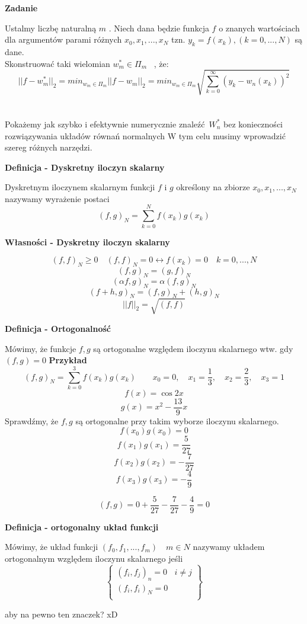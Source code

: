 \documentclass[polish]{kbk}
\begin{document}
\begin{center}
\textbf{Zadanie}
\end{center}
Ustalmy liczbę naturalną  \(m\) . Niech dana będzie funkcja \(f\) o znanych wartościach dla argumentów parami różnych \(x_0, x_1, ... , x_N\) tzn. 
 \(y_k = f(x_k), (k =0,...,N) \) są dane.\\
Skonstruować taki wielomian \(   w^{*}_m \in \Pi_{m}  \) ~\cite{znaczek}, że:
$$ || f -  w^{*}_m ||_2 = min_{ w_m \in \Pi_m } || f - w_m||_2 = min_{ w_m \in \Pi_m } \sqrt{  \sum_{k=0}^{\infty} (y_k - w_n (x_k))^2 }$$
\\
\\
Pokażemy jak szybko i efektywnie numerycznie znaleźć \(W^{*}_n \) bez konieczności rozwiązywania układów równań normalnych
W tym celu musimy wprowadzić szereg różnych narzędzi.
\\
\begin{center}
\textbf{Definicja - Dyskretny iloczyn skalarny}
\end{center}

Dyskretnym iloczynem skalarnym funkcji \(f\) i \(g\) określony na zbiorze  \(x_0, x_1, ... , x_N\) nazywamy wyrażenie postaci
$$ (f,g)_N =  \sum_{k=0}^{N} f(x_k)  g(x_k) $$


\begin{center}
\textbf{Własności - Dyskretny iloczyn skalarny}
\end{center}
$$ (f,f)_N \geq 0 \quad (f,f)_N = 0  \leftrightarrow  f(x_k) = 0  \quad k = 0,...,N$$
$$ (f,g)_N = (g,f)_N $$
$$ (\alpha f,g)_N = \alpha (f,g)_N $$
$$ (f+h, g)_N = (f,g)_N + (h,g)_N $$
$$ ||f||_2 = \sqrt { (f,f) } $$ 

\begin{center}
\textbf{Definicja - Ortogonalność}
\end{center}
Mówimy, że funkcje \(f,g\) są ortogonalne względem iloczynu skalarnego wtw. gdy \( (f,g) = 0 \)
\textbf{Przykład} \\
$$ (f,g)_N = \sum_{k=0}^{3} f(x_k)g(x_k) \quad  \quad x_0 = 0,  \quad x_1 = \frac{1}{3},  \quad x_2 = \frac{2}{3},  \quad x_3 = 1 $$
$$ f(x) = \cos{2x} $$
$$ g(x) = x^2 - \frac{13}{9}x $$
Sprawdźmy, że \(f,g\) są ortogonalne przy takim wyborze iloczynu skalarnego.
$$ f(x_0)g(x_0) = 0 $$
$$ f(x_1)g(x_1) = \frac{5}{27} $$
$$ f(x_2)g(x_2) = - \frac{7}{27} $$
$$ f(x_3)g(x_3) = - \frac{4}{9} $$

$$(f,g) = 0 + \frac{5}{27}  - \frac{7}{27} - \frac{4}{9} = 0 $$


\begin{center}
\textbf{Definicja - ortogonalny układ funkcji}
\end{center}
Mówimy, że układ funkcji \( (f_0, f_1,..., f_m)  \quad m \in N \) nazywamy układem ortogonalnym względem iloczynu skalarnego jeśli
  \[
    \left\{\begin{array}{lr}
        (f_i, f_j)_n = 0 & i \neq j\\
        (f_i, f_i)_N = 0 \\
        \end{array}\right\} 
  \]

\begin{thebibliography}{99}
 aby na pewno ten znaczek? xD

\end{thebibliography}
\end{document}
